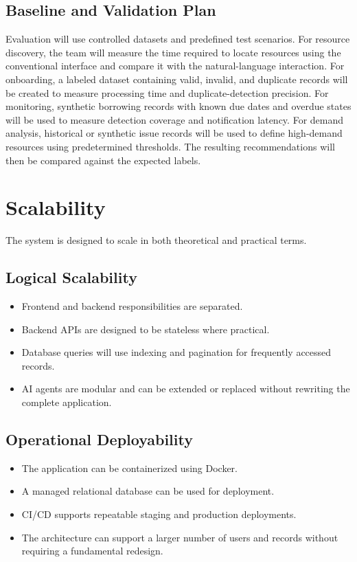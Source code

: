 \documentclass[11pt,a4paper]{article}
\begin{document}
\subsection{Baseline and Validation Plan}
Evaluation will use controlled datasets and predefined test scenarios.
For resource discovery, the team will measure the time required to locate resources using the conventional interface and compare it with the natural-language interaction.
For onboarding, a labeled dataset containing valid, invalid, and duplicate records will be created to measure processing time and duplicate-detection precision.
For monitoring, synthetic borrowing records with known due dates and overdue states will be used to measure detection coverage and notification latency.
For demand analysis, historical or synthetic issue records will be used to define high-demand resources using predetermined thresholds. The resulting recommendations will then be compared against the expected labels.

\section{Scalability}
The system is designed to scale in both theoretical and practical terms.

\subsection{Logical Scalability}
\begin{itemize}
    \item Frontend and backend responsibilities are separated.
    \item Backend APIs are designed to be stateless where practical.
    \item Database queries will use indexing and pagination for frequently accessed records.
    \item AI agents are modular and can be extended or replaced without rewriting the complete application.
\end{itemize}

\subsection{Operational Deployability}
\begin{itemize}
    \item The application can be containerized using Docker.
    \item A managed relational database can be used for deployment.
    \item CI/CD supports repeatable staging and production deployments.
    \item The architecture can support a larger number of users and records without requiring a fundamental redesign.
\end{itemize}
\end{document}
